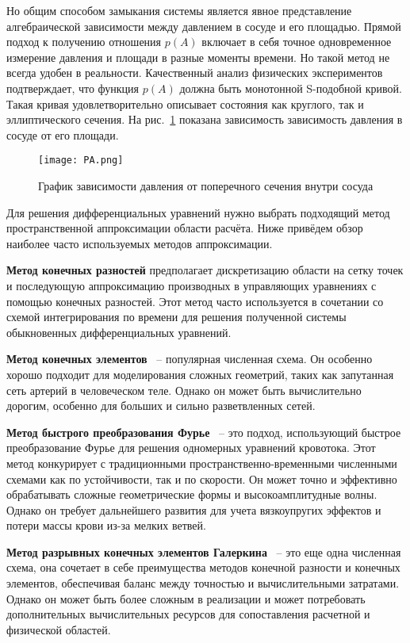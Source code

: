 Но общим способом замыкания системы является явное представление алгебраической зависимости
между давлением в сосуде и его площадью. Прямой подход к получению отношения $p(A)$ включает в себя точное одновременное измерение
давления и площади в разные моменты времени. Но такой метод не всегда удобен в реальности.
Качественный анализ физических экспериментов подтверждает, что функция $p(A)$ должна быть монотонной S-подобной кривой. 
Такая кривая удовлетворительно описывает состояния как круглого, так и эллиптического сечения. На рис.~\ref{ych} показана зависимость
зависимость давления в сосуде от его площади.

\begin{figure}[h]
    \centering
    \texttt{[image: PA.png]}
    \caption{График зависимости давления от поперечного сечения внутри сосуда}
    \label{ych}
\end{figure}

Для решения дифференциальных уравнений нужно выбрать подходящий метод пространственной аппроксимации области расчёта.
Ниже привёдем обзор наиболее часто используемых методов аппроксимации.

{\bf Метод конечных разностей} предполагает дискретизацию области на сетку точек и последующую аппроксимацию производных в управляющих
уравнениях с помощью конечных разностей. Этот метод часто используется в сочетании со схемой интегрирования по времени для решения 
полученной системы обыкновенных дифференциальных уравнений.

{\bf Метод конечных элементов}~\cite{TAYLOR1998} -- популярная численная схема. 
Он особенно хорошо подходит для моделирования сложных геометрий, таких как запутанная сеть артерий в человеческом теле. 
Однако он может быть вычислительно дорогим, особенно для больших и сильно разветвленных сетей. 

{\bf Метод быстрого преобразования Фурье}~\cite{Sazonov:2019} -- 
это подход, использующий быстрое преобразование Фурье для решения одномерных уравнений кровотока. 
Этот метод конкурирует с традиционными пространственно-временными численными схемами как по устойчивости, так и по скорости. 
Он может точно и эффективно обрабатывать сложные геометрические формы и высокоамплитудные волны. 
Однако он требует дальнейшего развития для учета вязкоупругих эффектов и потери массы крови из-за мелких ветвей. 

{\bf Метод разрывных конечных элементов Галеркина}~\cite{yao:2017} -- это еще одна численная схема, она сочетает в себе преимущества методов конечной разности и конечных элементов, 
обеспечивая баланс между точностью и вычислительными затратами. Однако он может быть более сложным в реализации и может
потребовать дополнительных вычислительных ресурсов для сопоставления расчетной и физической областей.

